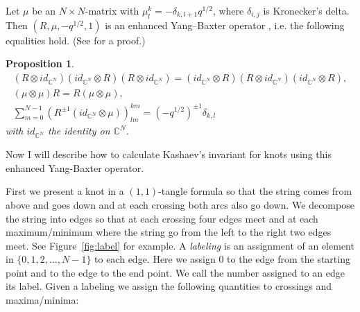 \documentclass[a4paper]{amsart}
\theoremstyle{plain}
\newtheorem{prop}[thm]{Proposition}
\theoremstyle{definition}
\theoremstyle{remark}
\newcommand{\C}{\mathbb{C}}
\numberwithin{equation}{section}
\numberwithin{figure}{section}
\begin{document}
Let $\mu$ be an $N\times N$-matrix with $\mu_l^k=-\delta_{k,l+1}q^{1/2}$,
where $\delta_{i,j}$ is Kronecker's delta.
Then $(R,\mu,-q^{1/2},1)$ is an enhanced Yang--Baxter operator
\cite{Turaev:INVEM88}, i.e. the following equalities hold.
(See \cite{Murakami/Murakami:volume} for a proof.)
\begin{prop}
  \begin{gather*}
    \left({R}\otimes{id}_{\C^N}\right)
    \left({id}_{\C^N}\otimes{R}\right)
    \left({R}\otimes{id}_{\C^N}\right)
    =
    \left({id}_{\C^N}\otimes{R}\right)
    \left({R}\otimes{id}_{\C^N}\right)
    \left({id}_{\C^N}\otimes{R}\right),
    \\
    \left(\mu\otimes\mu\right)R=R\left(\mu\otimes\mu\right),
    \\
    \sum_{m=0}^{N-1}\left(R^{\pm1}({id}_{\C^N}\otimes\mu)\right)_{lm}^{km}
    =\left(-q^{1/2}\right)^{\pm1}\delta_{k,l}
  \end{gather*}
with ${id}_{\C^N}$ the identity on $\C^N$.
\end{prop}
\par
Now I will describe how to calculate Kashaev's invariant for knots using this
enhanced Yang-Baxter operator.
\par
First we present a knot in a $(1,1)$-tangle formula so that the string comes
from above and goes down and at each crossing both arcs also go down.
We decompose the string into edges so that at each crossing four edges meet and
at each maximum/minimum where the string go from the left to the right two edges
meet.
See Figure~\ref{fig:label} for example.
A {\em labeling} is an assignment of an element in $\{0,1,2,\dots,N-1\}$ to
each edge.
Here we assign $0$ to the edge from the starting point and to the edge to the
end point.
We call the number assigned to an edge its label.
Given a labeling we assign the following quantities to crossings and
maxima/minima:
\setlength{\unitlength}{1mm}
\thicklines
\medskip
\end{document}
